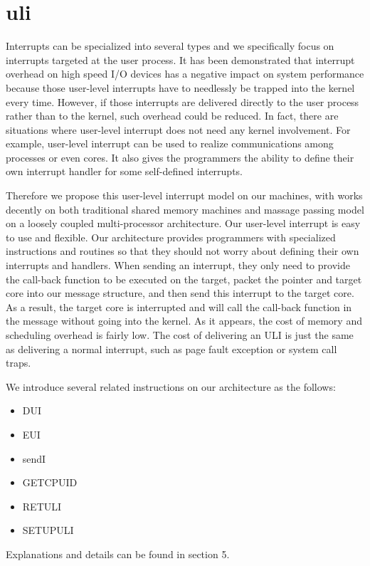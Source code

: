 \section{uli}
Interrupts can be specialized into several types and we specifically focus on interrupts targeted at the user process. It has been demonstrated that interrupt overhead on high speed I/O devices has a negative impact on system performance because those user-level interrupts have to needlessly be trapped into the kernel every time. However, if those interrupts are delivered directly to the user process rather than to the kernel, such overhead could be reduced. In fact, there are situations where user-level interrupt does not need any kernel involvement. For example, user-level interrupt can be used to realize communications among processes or even cores. It also gives the programmers the ability to define their own interrupt handler for some self-defined interrupts. 

Therefore we propose this user-level interrupt model on our machines, with works decently on both traditional shared memory machines and massage passing model on a loosely coupled multi-processor architecture. Our user-level interrupt is easy to use and flexible. Our architecture provides programmers with specialized instructions and routines so that they should not worry about defining their own interrupts and handlers. When sending an interrupt, they only need to provide the call-back function to be executed on the target, packet the pointer and target core into our message structure, and then send this interrupt to the target core. As a result, the target core is interrupted and will call the call-back function in the message without going into the kernel. As it appears, the cost of memory and scheduling overhead is fairly low. The cost of delivering an ULI is just the same as delivering a normal interrupt, such as page fault exception or system call traps. 

We introduce several related instructions on our architecture as the follows:
\begin{itemize}
\item DUI
\item EUI
\item sendI
\item GETCPUID
\item RETULI
\item SETUPULI
\end{itemize}
Explanations and details can be found in section 5.

